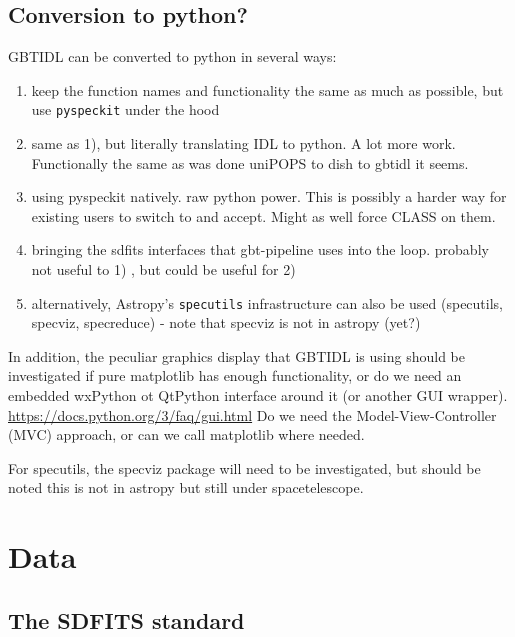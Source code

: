 \documentclass[12pt,a4paper]{article}
\begin{document}
\subsection{Conversion to python?}

GBTIDL can be converted to python in several ways:

\begin{enumerate}
\item
  keep the function names and functionality the same as much as possible,
    but use {\tt pyspeckit} under the hood

\item
  same as 1), but literally  translating IDL to python. A lot more work.
  Functionally the same as  was done uniPOPS to dish to gbtidl it seems.

\item
  using pyspeckit natively. raw python power. This is possibly a harder way for
  existing users to switch to and accept. Might as well force CLASS on them.
  
\item
  bringing the sdfits interfaces that gbt-pipeline uses into the loop.
  probably not useful to 1) , but could be useful for 2)

\item
  alternatively, Astropy's {\tt specutils} infrastructure can also be used
  (specutils, specviz, specreduce) - note that specviz is not in astropy (yet?)

\end{enumerate}

In addition, the peculiar graphics display that GBTIDL is using should
be investigated if pure matplotlib has enough functionality, or do we
need an embedded wxPython ot QtPython interface around it (or another
GUI wrapper).  \url{https://docs.python.org/3/faq/gui.html}
Do we need the Model-View-Controller (MVC) approach, or can we call
matplotlib where needed.

For specutils, the specviz package will need to be investigated, but
should be noted this is not in astropy but still under
spacetelescope.


\section{Data}

\subsection{The SDFITS standard}
\end{document}
